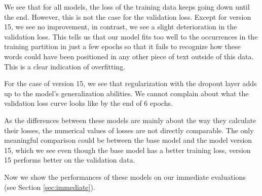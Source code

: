 We see that for all models, the loss of the training data keeps going down until the end. However, this is not the case for the validation loss. Except for version 15, we see no improvement, in contrast, we see a slight deterioration in the validation loss. This tells us that our model fits too well to the occurrences in the training partition in just a few epochs so that it fails to recognize how these words could have been positioned in any other piece of text outside of this data. This is a clear indication of overfitting. %

For the case of version 15, we see that regularization with the dropout layer adds up to the model's generalization abilities. We cannot complain about what the validation loss curve looks like by the end of 6 epochs.

As the differences between these models are mainly about the way they calculate their losses, the numerical values of losses are not directly comparable. The only meaningful comparison could be between the base model and the model version 15, which we see even though the base model has a better training loss, version 15 performs better on the validation data.

Now we show the performances of these models on our immediate evaluations (see Section \ref{sec:immediate}).

